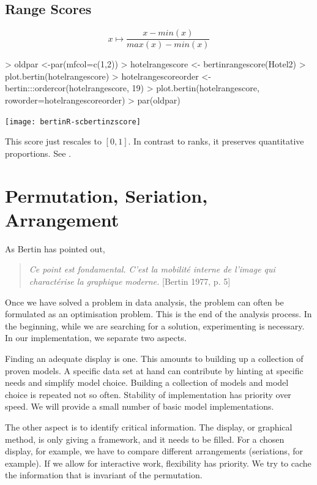 \documentclass[nogin, dvips,12pt,a4paper,twoside]{amsart}
\begin{document}
\subsection{Range Scores}
$$
x \mapsto \frac{ x - min(x)}{max(x)-min(x)}
$$
\begin{Schunk}
\begin{Sinput}
> oldpar <-par(mfcol=c(1,2))
> hotelrangescore <- bertinrangescore(Hotel2)
> plot.bertin(hotelrangescore)
> hotelrangescoreorder <- bertin:::ordercor(hotelrangescore, 19)
> plot.bertin(hotelrangescore, roworder=hotelrangescoreorder)
> par(oldpar)
\end{Sinput}
\end{Schunk}
\texttt{[image: bertinR-scbertinzscore]}

This score just rescales to $[0, 1]$. In contrast to ranks, it preserves quantitative proportions. See .

\section{Permutation, Seriation, Arrangement}
As Bertin has pointed out,
\begin{quotation}
\emph{Ce point est fondamental. C’est la mobilité interne de l’image qui charactérise la
graphique moderne.} [Bertin 1977, p. 5]
\end{quotation}
Once we have solved a problem in data analysis, the problem can often be formulated as an optimisation problem. This is the end of the analysis process. In the beginning, while we are searching for a solution, experimenting is necessary. In our implementation, we separate two aspects. 

Finding an adequate display is one. This amounts to building up a collection of proven models. A specific data set at hand can contribute by hinting at specific needs and simplify model choice. Building a collection of models and model choice is  repeated not so often. Stability of implementation has priority over speed. We will provide a small number of basic model implementations.

The other aspect is to identify critical information. The display, or graphical method, is only giving a framework, and it needs to be filled. For a chosen display, for example, we have to compare different arrangements (seriations, for example). If we allow for interactive work, flexibility has priority. We try to cache the information that is invariant of the permutation.
\end{document}
